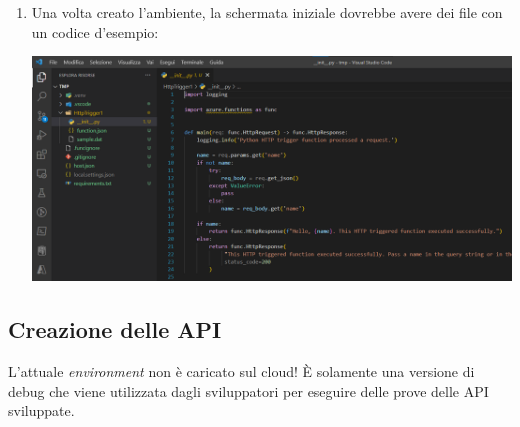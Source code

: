 \documentclass[a4paper]{article}
\begin{document}
\begin{enumerate}
		\item Una volta creato l'ambiente, la schermata iniziale dovrebbe avere dei file con un codice d'esempio:
		\begin{center}
			\centering
			\includegraphics[width=\linewidth]{img/azure-2.png}
		\end{center}
	\end{enumerate}\newpage
	
	\subsection{Creazione delle API}
	
	L'attuale \emph{environment} non è caricato sul cloud! È solamente una versione di debug che viene utilizzata dagli sviluppatori per eseguire delle prove delle API sviluppate.\newline
	
\end{document}
